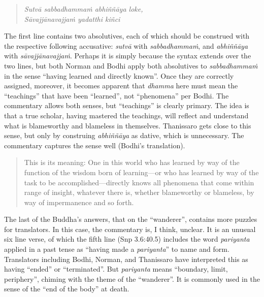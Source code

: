 \documentclass[12pt,openany]{book}%
\begin{document}
\begin{verse}%
\textit{\textsanskrit{Sutvā} \textsanskrit{sabbadhammaṁ} \textsanskrit{abhiññāya} loke,} \\
\textit{\textsanskrit{Sāvajjānavajjaṁ} yadatthi \textsanskrit{kiñci}}

%
\end{verse}

The first line contains two absolutives, each of which should be construed with the respective following accusative: \textit{\textsanskrit{sutvā}} with \textit{\textsanskrit{sabbadhammaṁ}}, and \textit{\textsanskrit{abhiññāya}} with \textit{\textsanskrit{sāvajjānavajjaṁ}}. Perhaps it is simply because the syntax extends over the two lines, but both Norman and Bodhi apply both absolutives to \textit{\textsanskrit{sabbadhammaṁ}} in the sense “having learned and directly known”. Once they are correctly assigned, moreover, it becomes apparent that \textit{dhamma} here must mean the “teachings” that have been “learned”, not “phenomena” per Bodhi. The commentary allows both senses, but “teachings” is clearly primary. The idea is that a true scholar, having mastered the teachings, will reflect and understand what is blameworthy and blameless in themselves. Thanissaro gets close to this sense, but only by construing \textit{\textsanskrit{abhiññāya}} as dative, which is unnecessary. The commentary captures the sense well (Bodhi’s translation).

\begin{quotation}%
This is its meaning: One in this world who has learned by way of the function of the wisdom born of learning—or who has learned by way of the task to be accomplished—directly knows all phenomena that come within range of insight, whatever there is, whether blameworthy or blameless, by way of impermanence and so forth.

%
\end{quotation}

The last of the Buddha’s answers, that on the “wanderer”, contains more puzzles for translators. In this case, the commentary is, I think, unclear. It is an unusual six line verse, of which the fifth line (Snp 3.6:40.5) includes the word \textit{pariyanta} applied in a past tense as “having made a \textit{pariyanta}” to name and form. Translators including Bodhi, Norman, and Thanissaro have interpreted this as having “ended” or “terminated”. But \textit{pariyanta} means “boundary, limit, periphery”, chiming with the theme of the “wanderer”. It is commonly used in the sense of the “end of the body” at death. 
\end{document}
